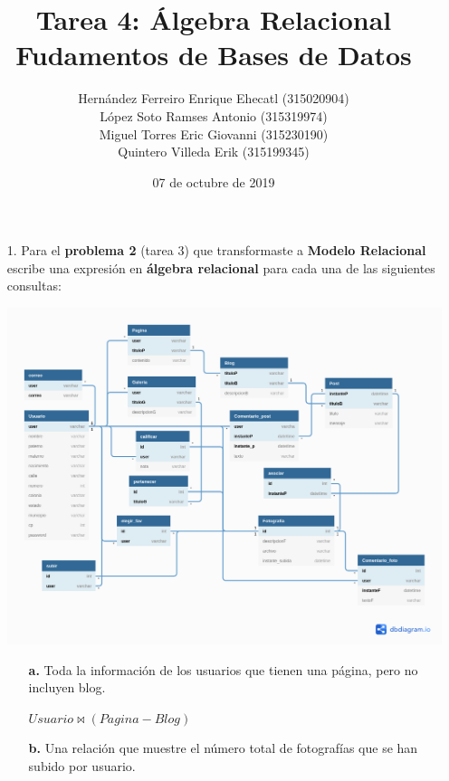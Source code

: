 \documentclass[12pt, letterpaper]{article}
\author{Hernández Ferreiro Enrique Ehecatl (315020904) \\
        López Soto Ramses Antonio (315319974) \\
        Miguel Torres Eric Giovanni (315230190) \\
        Quintero Villeda Erik (315199345)}
\title{Tarea 4: Álgebra Relacional \\
       {\small Fudamentos de Bases de Datos}}
\date{07 de octubre de 2019}
\begin{document}
    \maketitle

    \begin{itemize}

        \item[1.]   Para el \textbf{problema 2} (tarea 3) que transformaste a 
                    \textbf{Modelo Relacional} escribe una expresión en 
                    \textbf{álgebra relacional} para cada una de las siguientes 
                    consultas:

                    \includegraphics[scale=0.35]{Facebook.png}

                    \newpage

            \begin{itemize}

                \item[\textbf{a.}]   Toda la información de los usuarios que tienen una 
                            página, pero no incluyen blog. 

                            \begin{center}
                                $Usuario \Join (Pagina - Blog)$
                            \end{center}   
                            
                \item[\textbf{b.}]   Una relación que muestre el número total de 
                            fotografías que se han subido por usuario.


\end{itemize}
\end{itemize}
\end{document}
